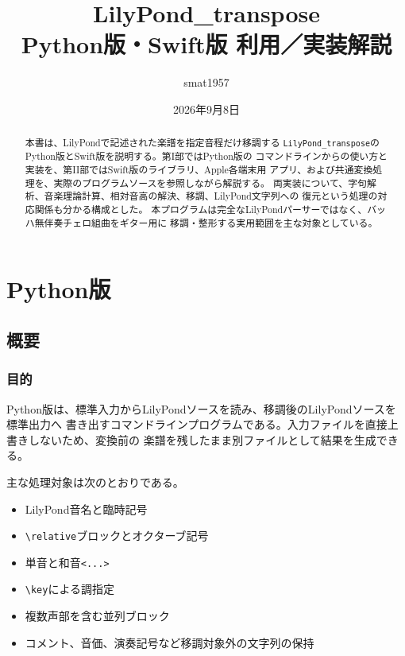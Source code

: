 \documentclass[uplatex,a4paper,11pt]{jsbook}
\title{LilyPond\_transpose\\Python版・Swift版 利用／実装解説}
\author{smat1957}
\date{2026年9月8日}
\begin{document}
\maketitle

\begin{abstract}
本書は、LilyPondで記述された楽譜を指定音程だけ移調する
\texttt{LilyPond\_transpose}のPython版とSwift版を説明する。第I部ではPython版の
コマンドラインからの使い方と実装を、第II部ではSwift版のライブラリ、Apple各端末用
アプリ、および共通変換処理を、実際のプログラムソースを参照しながら解説する。
両実装について、字句解析、音楽理論計算、相対音高の解決、移調、LilyPond文字列への
復元という処理の対応関係も分かる構成とした。
本プログラムは完全なLilyPondパーサーではなく、バッハ無伴奏チェロ組曲をギター用に
移調・整形する実用範囲を主な対象としている。
\end{abstract}

\tableofcontents

\part{Python版}

\chapter{概要}

\section{目的}

Python版は、標準入力からLilyPondソースを読み、移調後のLilyPondソースを標準出力へ
書き出すコマンドラインプログラムである。入力ファイルを直接上書きしないため、変換前の
楽譜を残したまま別ファイルとして結果を生成できる。

主な処理対象は次のとおりである。

\begin{itemize}
  \item LilyPond音名と臨時記号
  \item \texttt{\textbackslash relative}ブロックとオクターブ記号
  \item 単音と和音\texttt{<...>}
  \item \texttt{\textbackslash key}による調指定
  \item 複数声部を含む並列ブロック
  \item コメント、音価、演奏記号など移調対象外の文字列の保持
\end{itemize}
\end{document}
